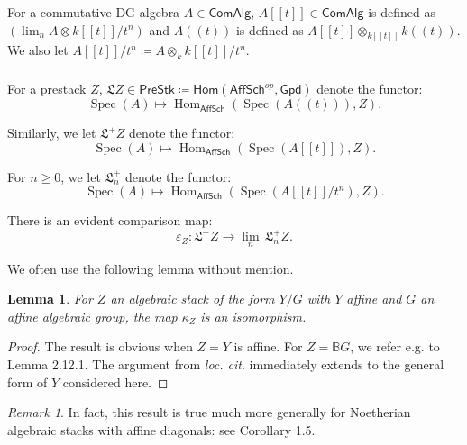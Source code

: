 \documentclass[reqno,11pt]{amsart}
\numberwithin{equation}{subsection}
\newtheorem{lem}[thm]{Lemma}
\theoremstyle{remark}
\newtheorem{rem}[thm]{Remark}
\newcommand{\bB}{{\mathbb B}}
\newcommand{\fL}{{\mathfrak L}}
\newcommand{\on}{\operatorname}
\newcommand{\Hom}{\on{Hom}}
\newcommand{\Spec}{\on{Spec}}
\newcommand{\vareps}{\varepsilon}
\newcommand{\Gpd}{\mathsf{Gpd}}
\renewcommand{\lim}{\on{lim}}
\newcommand{\TwoHom}{\mathsf{Hom}}
\newcommand{\AffSch}{\mathsf{AffSch}}
\newcommand{\PreStk}{\mathsf{PreStk}}
\newcommand{\ComAlg}{\mathsf{ComAlg}}
\begin{document}
\subsubsection{}

For a commutative DG algebra $A \in \ComAlg$, 
$A[[t]] \in \ComAlg$ is defined as 
$(\lim_n A \otimes k[[t]]/t^n)$ and $A((t))$ is defined
as $A[[t]] \otimes_{k[[t]]} k((t))$. We also let
$A[[t]]/t^n \coloneqq A \otimes_k k[[t]]/t^n$.

\subsubsection{}

For a prestack $Z$, 
$\fL Z \in \PreStk \coloneqq \TwoHom(\AffSch^{op},\Gpd)$ denote the functor:
%
\[
\Spec(A) \mapsto \Hom_{\AffSch}(\Spec(A((t))),Z).
\]

\noindent Similarly, we let $\fL^+ Z$ denote the functor:
%
\[
\Spec(A) \mapsto \Hom_{\AffSch}(\Spec(A[[t]]),Z).
\]

For $n \geq 0$, we let $\fL_n^+$ denote the functor:
%
\[
\Spec(A) \mapsto \Hom_{\AffSch}(\Spec(A[[t]]/t^n),Z).
\]

There is an evident comparison map:
%
\[
\vareps_Z:\fL^+ Z \to \underset{n}{\lim} \, \fL_n^+ Z.
\]

We often use the following lemma without mention.

\begin{lem}

For $Z$ an algebraic stack of 
the form $Y/G$ with $Y$ affine and $G$ an affine 
algebraic group, the map $\kappa_Z$ is an isomorphism.

\end{lem}

\begin{proof}

The result is obvious when $Z = Y$ is affine.
For $Z = \bB G$, we refer e.g. to \cite{cpsii} Lemma 2.12.1.
The argument from \emph{loc. cit}. immediately
extends to the general form of $Y$ considered here.

\end{proof}

\begin{rem}

In fact, this result is true much more 
generally for Noetherian algebraic
stacks with affine diagonals: see \cite{bhatt-hl} Corollary 1.5.

\end{rem}
\end{document}
